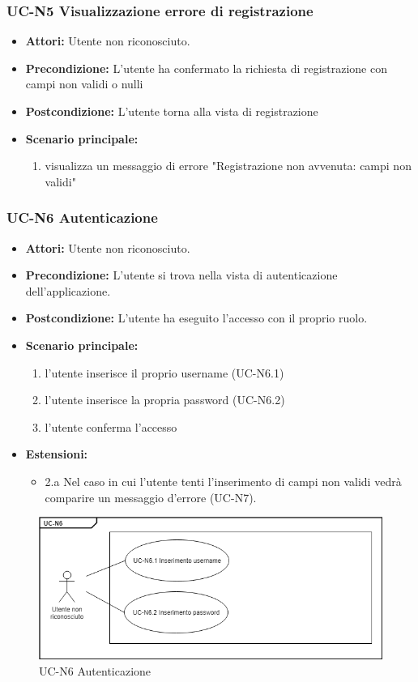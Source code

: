 \subsubsection{UC-N5 Visualizzazione errore di registrazione}
\begin{itemize}
	\item \textbf{Attori:} Utente non riconosciuto.
	\item \textbf{Precondizione:} L'utente ha confermato la richiesta di registrazione con campi non validi o nulli
	\item \textbf{Postcondizione:} L'utente torna alla vista di registrazione
	\item  \textbf{Scenario principale: }
	\begin{enumerate}
		\item visualizza un messaggio di errore "Registrazione non avvenuta: campi non validi"
	\end{enumerate}
\end{itemize}

\subsubsection{UC-N6 Autenticazione}
		\begin{itemize}
			\item \textbf{Attori:} Utente non riconosciuto.
			\item \textbf{Precondizione:} L'utente si trova nella vista di autenticazione dell'applicazione.
			\item \textbf{Postcondizione:} L'utente ha eseguito l'accesso con il proprio ruolo.
			\item \textbf{Scenario principale:}
				\begin{enumerate}
					\item l'utente inserisce il proprio username (UC-N6.1)
					\item l'utente inserisce la propria password (UC-N6.2)
					\item l'utente conferma l'accesso
				\end{enumerate}
				\item \textbf{Estensioni:}
				\begin{itemize}
					\item 2.a Nel caso in cui l'utente tenti l'inserimento di campi non validi vedrà comparire un messaggio d'errore (UC-N7).
				\end{itemize}
		\end{itemize}
		\begin{figure}[htbp]
			\centering
			\includegraphics[scale=0.7]{images/UC-N6.png}
			\caption{UC-N6 Autenticazione}
		\end{figure}		
		
